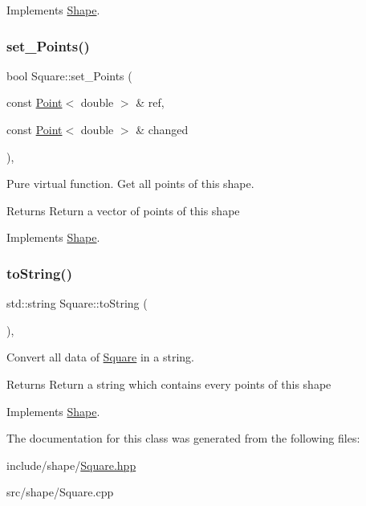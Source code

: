 Implements \hyperlink{classShape_a2dea8616fd40f2d69fd208715921982a}{Shape}.

\mbox{\label{classSquare_ac474644483fa85f7a4f39969f34868fe}} 
\subsubsection{\texorpdfstring{set\+\_\+\+Points()}{set\_Points()}}
{\footnotesize\ttfamily bool Square\+::set\+\_\+\+Points (\begin{DoxyParamCaption}\item[{const \hyperlink{classPoint}{Point}$<$ double $>$ \&}]{ref,  }\item[{const \hyperlink{classPoint}{Point}$<$ double $>$ \&}]{changed }\end{DoxyParamCaption})\hspace{0.3cm}{\ttfamily [override]}, {\ttfamily [virtual]}}



Pure virtual function. Get all points of this shape. 

\begin{DoxyReturn}{Returns}
Return a vector of points of this shape 
\end{DoxyReturn}


Implements \hyperlink{classShape_a6eb0d80cccc44cb72b06c61d9780bc6b}{Shape}.

\mbox{\label{classSquare_aa5d7db8004bba3c400f57513d93b21d4}} 
\subsubsection{\texorpdfstring{to\+String()}{toString()}}
{\footnotesize\ttfamily std\+::string Square\+::to\+String (\begin{DoxyParamCaption}{ }\end{DoxyParamCaption})\hspace{0.3cm}{\ttfamily [override]}, {\ttfamily [virtual]}}



Convert all data of \hyperlink{classSquare}{Square} in a string. 

\begin{DoxyReturn}{Returns}
Return a string which contains every points of this shape 
\end{DoxyReturn}


Implements \hyperlink{classShape_a98fa87c6dc4c7045fd6897a8f3bc186c}{Shape}.



The documentation for this class was generated from the following files\+:\begin{DoxyCompactItemize}
\item 
include/shape/\hyperlink{Square_8hpp}{Square.\+hpp}\item 
src/shape/Square.\+cpp\end{DoxyCompactItemize}
